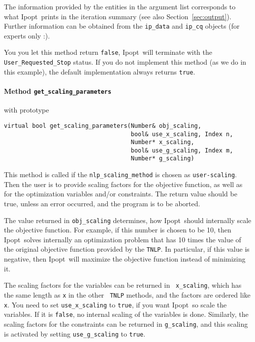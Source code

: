 \documentclass[10pt]{article}
\newcommand{\Ipopt}{{\sc Ipopt}}
\begin{document}
The information provided by the entities in the argument list
corresponds to what \Ipopt\ prints in the iteration summary (see also
Section~\ref{sec:output}).  Further information can be obtained from
the {\tt ip\_data} and {\tt ip\_cq} objects (for experts only :).

You you let this method return {\tt false}, \Ipopt\ will terminate
with the {\tt User\_Requested\_Stop} status.  If you do not implement
this method (as we do in this example), the default implementation
always returns {\tt true}.

\paragraph{Method \texttt{get\_scaling\_parameters}} with prototype
\begin{verbatim}
virtual bool get_scaling_parameters(Number& obj_scaling,
                                    bool& use_x_scaling, Index n,
                                    Number* x_scaling,
                                    bool& use_g_scaling, Index m,
                                    Number* g_scaling)
\end{verbatim}

This method is called if the {\tt nlp\_scaling\_method} is chosen as
{\tt user-scaling}.  Then the user is to provide scaling factors for
the objective function, as well as for the optimization variables
and/or constraints.  The return value should be true, unless an error
occurred, and the program is to be aborted.

The value returned in {\tt obj\_scaling} determines, how \Ipopt\
should internally scale the objective function.  For example, if this
number is chosen to be 10, then \Ipopt\ solves internally an
optimization problem that has 10 times the value of the original
objective function provided by the {\tt TNLP}.  In particular, if this
value is negative, then \Ipopt\ will maximize the objective function
instead of minimizing it.

The scaling factors for the variables can be returned in {\tt
  x\_scaling}, which has the same length as {\tt x} in the other {\tt
  TNLP} methods, and the factors are ordered like {\tt x}.  You need
to set {\tt use\_x\_scaling} to {\tt true}, if you want \Ipopt\ so scale
the variables.  If it is {\tt false}, no internal scaling of the
variables is done.  Similarly, the scaling factors for the constraints
can be returned in {\tt g\_scaling}, and this scaling is activated by
setting {\tt use\_g\_scaling} to {\tt true}.
\end{document}
